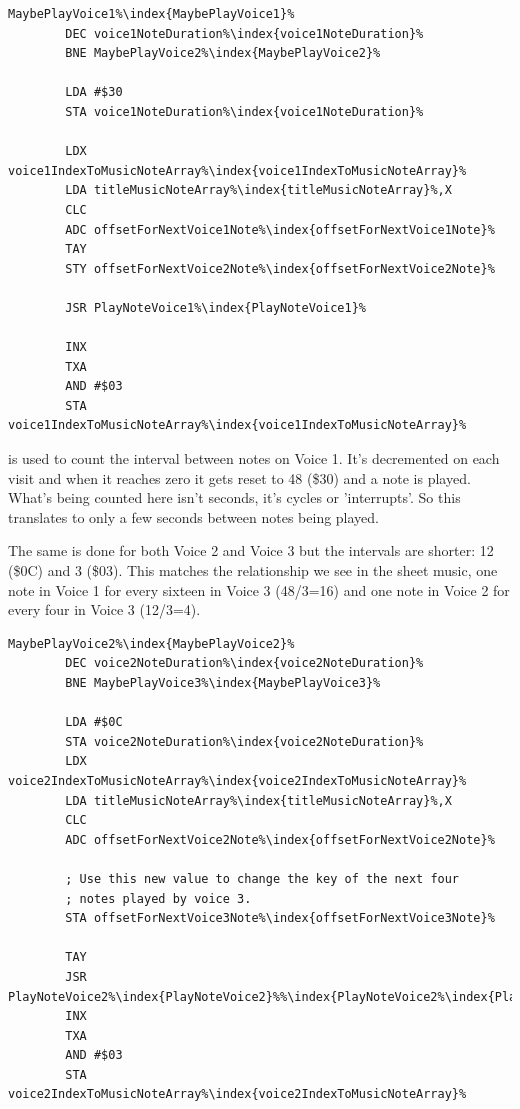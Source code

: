 \begin{lstlisting}[caption=\icode{MaybePlayVoice1\index{MaybePlayVoice1}}\, part of \icode{PlayTitleScreenMusic\index{PlayTitleScreenMusic}}.,escapechar=\%]
MaybePlayVoice1%\index{MaybePlayVoice1}%   
        DEC voice1NoteDuration%\index{voice1NoteDuration}%
        BNE MaybePlayVoice2%\index{MaybePlayVoice2}%

        LDA #$30
        STA voice1NoteDuration%\index{voice1NoteDuration}%

        LDX voice1IndexToMusicNoteArray%\index{voice1IndexToMusicNoteArray}%
        LDA titleMusicNoteArray%\index{titleMusicNoteArray}%,X
        CLC
        ADC offsetForNextVoice1Note%\index{offsetForNextVoice1Note}%
        TAY
        STY offsetForNextVoice2Note%\index{offsetForNextVoice2Note}%

        JSR PlayNoteVoice1%\index{PlayNoteVoice1}%

        INX
        TXA
        AND #$03
        STA voice1IndexToMusicNoteArray%\index{voice1IndexToMusicNoteArray}%
\end{lstlisting}
 is used to count the interval between notes on Voice 1. It's decremented on each
visit and when it reaches zero it gets reset to 48 (\$30) and a note is played. What's being counted here isn't
seconds, it's cycles or 'interrupts'. So this translates to only a few seconds between notes being played.

The same is done for both Voice 2 and Voice 3 but the intervals are shorter: 12 (\$0C) and 3 (\$03). This matches
the relationship we see in the sheet music, one note in Voice 1 for every sixteen in Voice 3 (48/3=16) and one note in
Voice 2 for every four in Voice 3 (12/3=4).

\begin{lstlisting}[caption=\icode{MaybePlayVoice2\index{MaybePlayVoice2}}\, part of \icode{PlayTitleScreenMusic\index{PlayTitleScreenMusic}}.,escapechar=\%]
MaybePlayVoice2%\index{MaybePlayVoice2}%   
        DEC voice2NoteDuration%\index{voice2NoteDuration}%
        BNE MaybePlayVoice3%\index{MaybePlayVoice3}%

        LDA #$0C
        STA voice2NoteDuration%\index{voice2NoteDuration}%
        LDX voice2IndexToMusicNoteArray%\index{voice2IndexToMusicNoteArray}%
        LDA titleMusicNoteArray%\index{titleMusicNoteArray}%,X
        CLC
        ADC offsetForNextVoice2Note%\index{offsetForNextVoice2Note}%

        ; Use this new value to change the key of the next four
        ; notes played by voice 3. 
        STA offsetForNextVoice3Note%\index{offsetForNextVoice3Note}%

        TAY
        JSR PlayNoteVoice2%\index{PlayNoteVoice2}%%\index{PlayNoteVoice2%\index{PlayNoteVoice2}%}%
        INX
        TXA
        AND #$03
        STA voice2IndexToMusicNoteArray%\index{voice2IndexToMusicNoteArray}%
\end{lstlisting}

